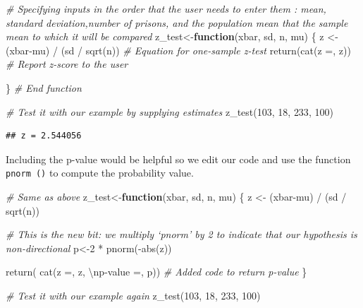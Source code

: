 \documentclass[
]{book}
\newenvironment{Shaded}{\begin{snugshade}}{\end{snugshade}}
\newcommand{\CommentTok}[1]{\textcolor[rgb]{0.56,0.35,0.01}{\textit{#1}}}
\newcommand{\ControlFlowTok}[1]{\textcolor[rgb]{0.13,0.29,0.53}{\textbf{#1}}}
\newcommand{\DecValTok}[1]{\textcolor[rgb]{0.00,0.00,0.81}{#1}}
\newcommand{\FunctionTok}[1]{\textcolor[rgb]{0.00,0.00,0.00}{#1}}
\newcommand{\NormalTok}[1]{#1}
\newcommand{\OtherTok}[1]{\textcolor[rgb]{0.56,0.35,0.01}{#1}}
\newcommand{\SpecialCharTok}[1]{\textcolor[rgb]{0.00,0.00,0.00}{#1}}
\newcommand{\StringTok}[1]{\textcolor[rgb]{0.31,0.60,0.02}{#1}}
\begin{document}
\begin{Shaded}
\begin{Highlighting}[]
\CommentTok{\# Specifying inputs in the order that the user needs to enter them : mean, standard deviation,number of prisons, and the population mean that the sample mean to which it will be compared}
\NormalTok{z\_test}\OtherTok{\textless{}{-}}\ControlFlowTok{function}\NormalTok{(xbar, sd, n, mu) \{ }
\NormalTok{  z }\OtherTok{\textless{}{-}}\NormalTok{ (xbar}\SpecialCharTok{{-}}\NormalTok{mu) }\SpecialCharTok{/}\NormalTok{ (sd }\SpecialCharTok{/} \FunctionTok{sqrt}\NormalTok{(n)) }\CommentTok{\# Equation for one{-}sample z{-}test}
  \FunctionTok{return}\NormalTok{(}\FunctionTok{cat}\NormalTok{(}\StringTok{\textquotesingle{}z =\textquotesingle{}}\NormalTok{, z)) }\CommentTok{\# Report z{-}score to the user}

\NormalTok{\} }\CommentTok{\# End function}

\CommentTok{\# Test it with our example by supplying estimates }
\FunctionTok{z\_test}\NormalTok{(}\DecValTok{103}\NormalTok{, }\DecValTok{18}\NormalTok{, }\DecValTok{233}\NormalTok{, }\DecValTok{100}\NormalTok{)}
\end{Highlighting}
\end{Shaded}

\begin{verbatim}
## z = 2.544056
\end{verbatim}

Including the p-value would be helpful so we edit our code and use the function \texttt{pnorm\ ()} to compute the probability value.

\begin{Shaded}
\begin{Highlighting}[]
\CommentTok{\# Same as above}
\NormalTok{z\_test}\OtherTok{\textless{}{-}}\ControlFlowTok{function}\NormalTok{(xbar, sd, n, mu) \{ }
\NormalTok{z }\OtherTok{\textless{}{-}}\NormalTok{ (xbar}\SpecialCharTok{{-}}\NormalTok{mu) }\SpecialCharTok{/}\NormalTok{ (sd }\SpecialCharTok{/} \FunctionTok{sqrt}\NormalTok{(n)) }

\CommentTok{\# This is the new bit: we multiply ‘pnorm’ by 2 to indicate that our hypothesis is non{-}directional }
\NormalTok{p}\OtherTok{\textless{}{-}}\DecValTok{2} \SpecialCharTok{*} \FunctionTok{pnorm}\NormalTok{(}\SpecialCharTok{{-}}\FunctionTok{abs}\NormalTok{(z)) }

\FunctionTok{return}\NormalTok{( }\FunctionTok{cat}\NormalTok{(}\StringTok{\textquotesingle{}z =\textquotesingle{}}\NormalTok{, z, }
\StringTok{\textquotesingle{}}\SpecialCharTok{\textbackslash{}n}\StringTok{p{-}value =\textquotesingle{}}\NormalTok{, p)) }\CommentTok{\# Added code to return p{-}value}
\NormalTok{\} }

\CommentTok{\# Test it with our example again }
\FunctionTok{z\_test}\NormalTok{(}\DecValTok{103}\NormalTok{, }\DecValTok{18}\NormalTok{, }\DecValTok{233}\NormalTok{, }\DecValTok{100}\NormalTok{)}
\end{Highlighting}
\end{Shaded}
\end{document}
